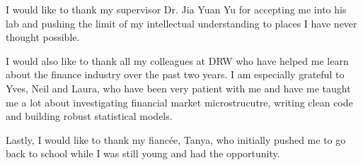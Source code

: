 \begin{acknowledgments}
  
  I would like to thank my supervisor Dr. Jia Yuan Yu for accepting me into his lab and pushing the limit of my intellectual understanding to places I have never thought possible. 
  
  I would also like to thank all my colleagues at DRW who have helped me learn about the finance industry over the past two years. I am especially grateful to Yves, Neil and Laura, who have been very patient with me and have me taught me a lot about investigating financial market microstrucutre, writing clean code and building robust statistical models.
  
  Lastly, I would like to thank my fiancée, Tanya, who initially pushed me to go back to school while I was still young and had the opportunity. 
\end{acknowledgments}